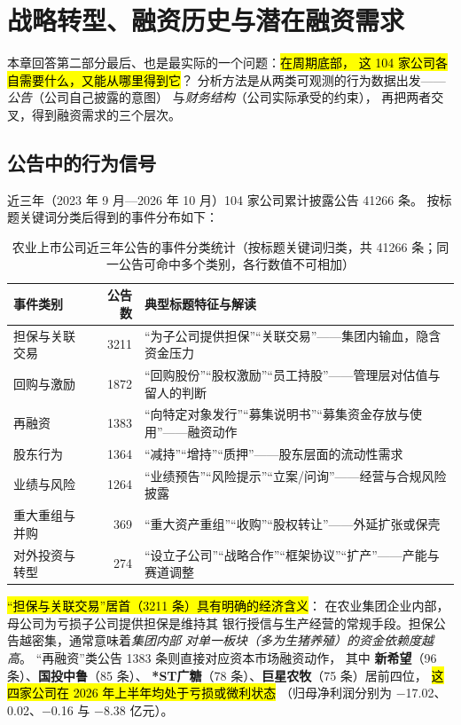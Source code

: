 \section{战略转型、融资历史与潜在融资需求}
\label{sec:financing}

本章回答第二部分最后、也是最实际的一个问题：\hl{在周期底部，
这 \num{104} 家公司各自需要什么，又能从哪里得到它}？
分析方法是从两类可观测的行为数据出发——\emph{公告}（公司自己披露的意图）
与\emph{财务结构}（公司实际承受的约束），
再把两者交叉，得到融资需求的三个层次。

\subsection{公告中的行为信号}
\label{sec:financing-signals}

近三年（2023 年 9 月---2026 年 10 月）\num{104} 家公司累计披露公告 \num{41266} 条。
按标题关键词分类后得到的事件分布如下：

\begin{table}[htbp]
\centering
\footnotesize
\caption{农业上市公司近三年公告的事件分类统计（按标题关键词归类，共 \num{41266} 条；同一公告可命中多个类别，各行数值不可相加）}
\label{tab:fin-events}
\begin{tabular}{@{}p{2.9cm}rp{7.3cm}@{}}
\toprule
事件类别 & 公告数 & 典型标题特征与解读 \\
\midrule
担保与关联交易 & \num{3211} & “为子公司提供担保”“关联交易”——集团内输血，隐含资金压力 \\
回购与激励 & \num{1872} & “回购股份”“股权激励”“员工持股”——管理层对估值与留人的判断 \\
再融资 & \num{1383} & “向特定对象发行”“募集说明书”“募集资金存放与使用”——融资动作 \\
股东行为 & \num{1364} & “减持”“增持”“质押”——股东层面的流动性需求 \\
业绩与风险 & \num{1264} & “业绩预告”“风险提示”“立案/问询”——经营与合规风险披露 \\
重大重组与并购 & \num{369} & “重大资产重组”“收购”“股权转让”——外延扩张或保壳 \\
对外投资与转型 & \num{274} & “设立子公司”“战略合作”“框架协议”“扩产”——产能与赛道调整 \\
\bottomrule
\end{tabular}
\end{table}

\hl{“担保与关联交易”居首（\num{3211} 条）具有明确的经济含义}：
在农业集团企业内部，母公司为亏损子公司提供担保是维持其
银行授信与生产经营的常规手段。担保公告越密集，通常意味着\emph{集团内部
对单一板块（多为生猪养殖）的资金依赖度越高}。
“再融资”类公告 \num{1383} 条则直接对应资本市场融资动作，
其中 \textbf{新希望}（\num{96} 条）、\textbf{国投中鲁}（\num{85} 条）、
\textbf{*ST广糖}（\num{78} 条）、\textbf{巨星农牧}（\num{75} 条）居前四位，
\hl{这四家公司在 2026 年上半年均处于亏损或微利状态}
（归母净利润分别为 \num{-17.02}、\num{0.02}、\num{-0.16} 与 \num{-8.38} 亿元）。

